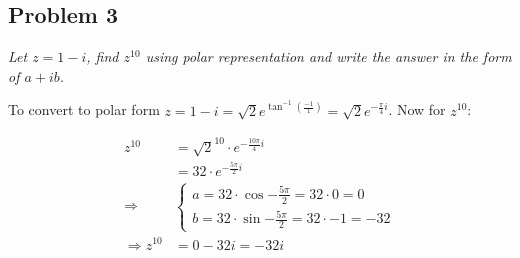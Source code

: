 \documentclass[11pt]{article}
\begin{document}
\subsection*{Problem 3}
\textit{Let $z= 1 - i$, find $z^{10}$ using polar representation and write the answer in the form of $a+ib$.}\newline

\noindent To convert to polar form $z = 1 - i = \sqrt{2} e^{\tan^{-1} (\frac{-1}{1})}= \sqrt{2} e^{-\frac{\pi}{4}i}$. Now for $z^{10}$:

\begin{align*}
    z^{10} &= \sqrt{2}^{10} \cdot e^{-\frac{10\pi}{4}i} \\
    &= 32 \cdot e^{-\frac{5\pi}{2}i} \\
    \Rightarrow &\begin{cases}
        a = 32 \cdot \cos{-\frac{5\pi}{2}} = 32 \cdot 0 = 0 \\
        b = 32 \cdot \sin{-\frac{5\pi}{2}} = 32 \cdot -1 = -32
    \end{cases} \\
    \Longrightarrow z^{10} &= 0 -32i = -32i
\end{align*}
\end{document}
